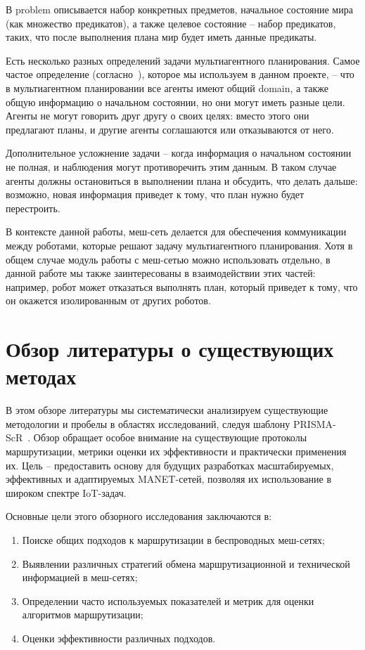 \documentclass[%
]{report}
\begin{document}
В problem описывается набор конкретных предметов,
начальное состояние мира (как множество предикатов),
а также целевое состояние -- набор предикатов, таких, что
после выполнения плана мир будет иметь данные предикаты.

Есть несколько разных определений задачи мультиагентного планирования.
Самое частое определение (согласно~\cite{doi:10.3233/MGS-2009-0133}),
которое мы используем в данном проекте, --
что в мультиагентном планировании
все агенты имеют общий domain,
а также общую информацию о начальном состоянии,
но они могут иметь разные цели.
Агенты не могут говорить друг другу о своих целях:
вместо этого они предлагают планы,
и другие агенты соглашаются или отказываются от него.

Дополнительное усложнение задачи --
когда информация о начальном состоянии не полная,
и наблюдения могут противоречить этим данным.
В таком случае агенты должны остановиться в выполнении плана
и обсудить, что делать дальше:
возможно, новая информация приведет к тому, что план нужно будет перестроить.

В контексте данной работы, меш-сеть делается для обеспечения коммуникации между роботами,
которые решают задачу мультиагентного планирования.
Хотя в общем случае модуль работы с меш-сетью можно использовать отдельно,
в данной работе мы также заинтересованы в взаимодействии этих частей:
например, робот может отказаться выполнять план,
который приведет к тому, что он окажется изолированным от других роботов.


\chapter{Обзор литературы о существующих методах}

В этом обзоре литературы мы
систематически анализируем существующие методологии
и пробелы в областях исследований,
следуя шаблону PRISMA-ScR~\cite{prisma-src}.
Обзор обращает особое внимание на
существующие протоколы маршрутизации,
метрики оценки их эффективности и практически применения их.
Цель -- предоставить основу для будущих разработках
масштабируемых, эффективных и адаптируемых
MANET-сетей,
позволяя их использование в широком спектре IoT-задач.

Основные цели этого обзорного исследования заключаются в:

\begin{enumerate}

\item Поиске общих подходов к маршрутизации в беспроводных меш-сетях;
\item Выявлении различных стратегий обмена маршрутизационной и технической информацией в меш-сетях;
\item Определении часто используемых показателей и метрик для оценки алгоритмов маршрутизации;
\item Оценки эффективности различных подходов.
\end{enumerate}
\end{document}

